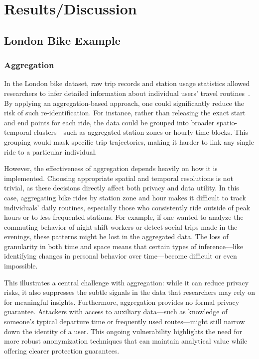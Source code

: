 \documentclass[twocolumn]{article}
\begin{document}
\section{Results/Discussion} \label{Results}

\subsection{London Bike Example}

\subsubsection{Aggregation}
In the London bike dataset, raw trip records and station usage statistics allowed researchers to infer detailed information about individual users’ travel routines~\cite{London}. By applying an aggregation-based approach, one could significantly reduce the risk of such re-identification. For instance, rather than releasing the exact start and end points for each ride, the data could be grouped into broader spatio-temporal clusters—such as aggregated station zones or hourly time blocks. This grouping would mask specific trip trajectories, making it harder to link any single ride to a particular individual.

However, the effectiveness of aggregation depends heavily on how it is implemented. Choosing appropriate spatial and temporal resolutions is not trivial, as these decisions directly affect both privacy and data utility. In this case, aggregating bike rides by station zone and hour makes it difficult to track individuals’ daily routines, especially those who consistently ride outside of peak hours or to less frequented stations. For example, if one wanted to analyze the commuting behavior of night-shift workers or detect social trips made in the evenings, these patterns might be lost in the aggregated data. The loss of granularity in both time and space means that certain types of inference—like identifying changes in personal behavior over time—become difficult or even impossible.

This illustrates a central challenge with aggregation: while it can reduce privacy risks, it also suppresses the subtle signals in the data that researchers may rely on for meaningful insights. Furthermore, aggregation provides no formal privacy guarantee. Attackers with access to auxiliary data—such as knowledge of someone’s typical departure time or frequently used routes—might still narrow down the identity of a user. This ongoing vulnerability highlights the need for more robust anonymization techniques that can maintain analytical value while offering clearer protection guarantees.
\end{document}
